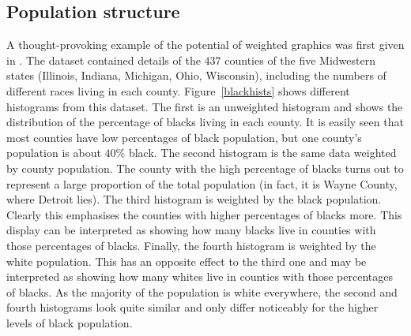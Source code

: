 \documentclass{svmult}
\begin{document}
\subsection{Population structure}
\label{pop}
A thought-provoking example of the potential of weighted graphics was first given in \cite{unwin:1998a}.  The dataset contained details of the $437$ counties of the five Midwestern states (Illinois, Indiana, Michigan, Ohio, Wisconsin), including the numbers of different races living in each county.  Figure~\ref{blackhists} shows different histograms from this dataset.  The first is an unweighted histogram and shows the distribution of the percentage of blacks living in each county.  It is easily seen that most counties have low percentages of black population, but one county's population is about $40\%$ black.  The second histogram is the same data weighted by county population.  The county with the high percentage of blacks turns out to represent a large proportion of the total population (in fact, it is Wayne County, where Detroit lies).  The third histogram is weighted by the black population.  Clearly this emphasises the counties with higher percentages of blacks more.  This display can be interpreted as showing how many blacks live in counties with those percentages of blacks.  Finally, the fourth histogram is weighted by the white population.  This has an opposite effect to the third one and may be interpreted as showing how many whites live in counties with those percentages of blacks.  As the majority of the population is white everywhere, the second and fourth histograms look quite similar and only differ noticeably for the higher levels of black population.
\end{document}
